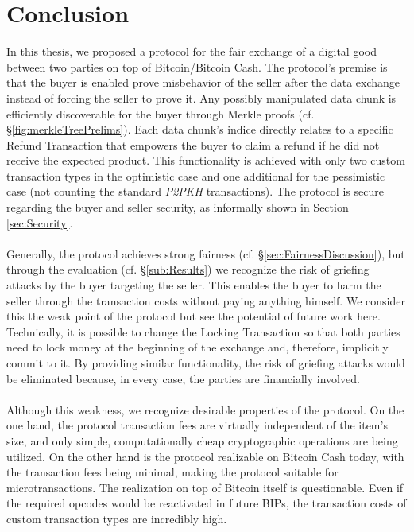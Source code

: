 \documentclass{cacthesis}
\newcounter{protocol}
\begin{document}
	\chapter{Conclusion}
	\label{sec:Conclusion}
    In this thesis, we proposed a protocol for the fair exchange of a digital good between two parties on top of Bitcoin/Bitcoin Cash. The protocol's premise is that the buyer is enabled prove misbehavior of the seller after the data exchange instead of forcing the seller to prove it. Any possibly manipulated data chunk is efficiently discoverable for the buyer through Merkle proofs (cf. §\ref{fig:merkleTreePrelims}). Each data chunk's indice directly relates to a specific Refund Transaction that empowers the buyer to claim a refund if he did not receive the expected product. This functionality is achieved with only two custom transaction types in the optimistic case and one additional for the pessimistic case (not counting the standard \textit{P2PKH} transactions). The protocol is secure regarding the buyer and seller security, as informally shown in Section \ref{sec:Security}. \\\\
    Generally, the protocol achieves strong fairness (cf. §\ref{sec:FairnessDiscussion}), but through the evaluation (cf. §\ref{sub:Results}) we recognize the risk of griefing attacks by the buyer targeting the seller. This enables the buyer to harm the seller through the transaction costs without paying anything himself. We consider this the weak point of the protocol but see the potential of future work here. Technically, it is possible to change the Locking Transaction so that both parties need to lock money at the beginning of the exchange and, therefore, implicitly commit to it. By providing similar functionality, the risk of griefing attacks would be eliminated because, in every case, the parties are financially involved. \\\\
    Although this weakness, we recognize desirable properties of the protocol. On the one hand, the protocol transaction fees are virtually independent of the item's size, and only simple, computationally cheap cryptographic operations are being utilized. On the other hand is the protocol realizable on Bitcoin Cash today, with the transaction fees being minimal, making the protocol suitable for microtransactions. The realization on top of Bitcoin itself is questionable. Even if the required opcodes would be reactivated in future BIPs, the transaction costs of custom transaction types are incredibly high.    
    
	
	\newpage
    
    
	
	\appendix
\end{document}

